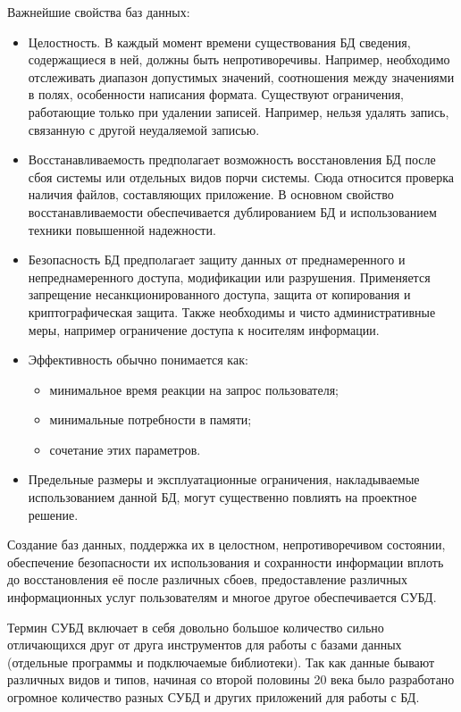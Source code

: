 Важнейшие свойства баз данных:
\begin{itemize}
\item Целостность. В каждый момент времени существования БД сведения, содержащиеся в ней, должны быть непротиворечивы. Например, необходимо отслеживать диапазон допустимых значений, соотношения между значениями в полях, особенности написания формата. Существуют ограничения, работающие только при удалении записей. Например, нельзя удалять запись, связанную с другой неудаляемой записью.
\item Восстанавливаемость предполагает возможность восстановления БД после сбоя системы или отдельных видов порчи системы. Сюда относится проверка наличия файлов, составляющих приложение. В основном свойство восстанавливаемости обеспечивается дублированием БД и использованием техники повышенной надежности.
\item Безопасность БД предполагает защиту данных от преднамеренного и непреднамеренного доступа, модификации или разрушения. Применяется запрещение несанкционированного доступа, защита от копирования и криптографическая защита. Также необходимы и чисто административные меры, например ограничение доступа к носителям информации. 
\item Эффективность обычно понимается как:
\begin{itemize}
\item  минимальное время реакции на запрос пользователя;
\item  минимальные потребности в памяти;
\item  сочетание этих параметров.
\end{itemize}
\item Предельные размеры и эксплуатационные ограничения, накладываемые использованием данной БД, могут существенно повлиять на проектное решение.
\end{itemize}
Создание баз данных, поддержка их в целостном, непротиворечивом состоянии, обеспечение безопасности их использования и сохранности информации вплоть до восстановления её после различных сбоев, предоставление различных информационных услуг пользователям и многое другое обеспечивается СУБД.

Термин СУБД включает в себя довольно большое количество сильно отличающихся друг от друга инструментов для работы с базами данных (отдельные программы и подключаемые библиотеки). Так как данные бывают различных видов и типов, начиная со второй половины 20 века было разработано огромное количество разных СУБД и других приложений для работы с БД.

